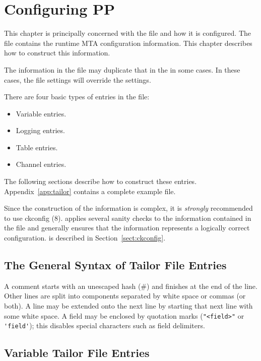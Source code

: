 \chapter {Configuring PP}\label{tailoring}

This chapter is principally concerned with the  file and
how it is configured.  The  file contains the runtime MTA
configuration information.  This chapter describes how to construct
this information.

The information in the  file may duplicate that in the
 in some cases. In these cases, the  file
settings will override the  settings. 

There are four basic types of entries in the  file:
\begin{itemize}
\item	Variable entries.
\item	Logging entries.
\item	Table entries.
\item	Channel entries.
\end{itemize}
The following sections describe how to construct these entries.
Appendix~\ref{app:tailor} contains a complete example  file.

Since the construction of the information is complex, it is {\em
strongly } recommended to use \man ckconfig (8).
 applies several sanity checks to the information
contained in the  file and generally ensures that the
information represents a logically correct configuration.
 is described in Section~\ref{sect:ckconfig}.

\section	{The General Syntax of Tailor File Entries}

A comment starts with an unescaped hash (\#) and finishes at the end
of the line.  Other lines are split into components separated by white
space or commas (or both). A line may be extended onto the next line
by starting that next line with some white space. A field may be
enclosed by quotation marks (\verb+"<field>"+ or \verb|'field'|); this
disables special characters such as field delimiters.

\section	{Variable Tailor File Entries}
\label{variable-tai}

